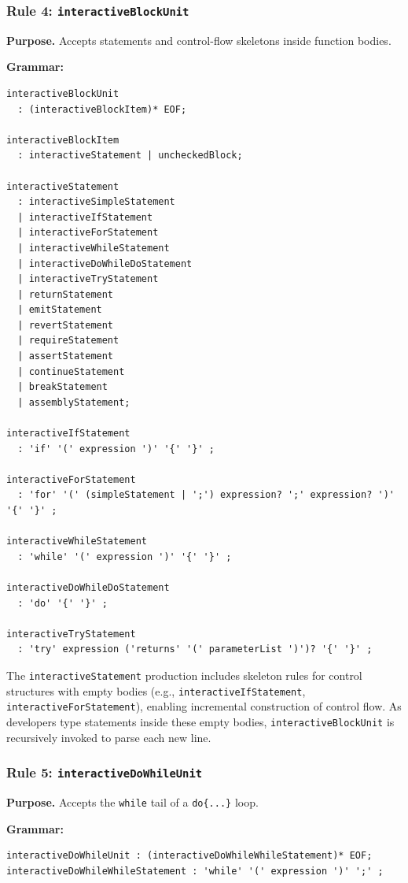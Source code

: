\documentclass[pdflatex,sn-basic]{sn-jnl}%
\theoremstyle{thmstyleone}%
\theoremstyle{thmstyletwo}%
\theoremstyle{thmstylethree}%
\begin{document}
\subsubsection{Rule 4: \texttt{interactiveBlockUnit}}
\noindent\textbf{Purpose.} Accepts statements and control-flow skeletons inside function bodies.

\noindent\textbf{Grammar:}
\begin{verbatim}
interactiveBlockUnit
  : (interactiveBlockItem)* EOF;

interactiveBlockItem
  : interactiveStatement | uncheckedBlock;

interactiveStatement
  : interactiveSimpleStatement
  | interactiveIfStatement
  | interactiveForStatement
  | interactiveWhileStatement
  | interactiveDoWhileDoStatement
  | interactiveTryStatement
  | returnStatement
  | emitStatement
  | revertStatement
  | requireStatement
  | assertStatement
  | continueStatement
  | breakStatement
  | assemblyStatement;

interactiveIfStatement
  : 'if' '(' expression ')' '{' '}' ;

interactiveForStatement
  : 'for' '(' (simpleStatement | ';') expression? ';' expression? ')' '{' '}' ;

interactiveWhileStatement
  : 'while' '(' expression ')' '{' '}' ;

interactiveDoWhileDoStatement
  : 'do' '{' '}' ;

interactiveTryStatement
  : 'try' expression ('returns' '(' parameterList ')')? '{' '}' ;
\end{verbatim}

\noindent The \texttt{interactiveStatement} production includes skeleton rules for
control structures with empty bodies (e.g., \texttt{interactiveIfStatement}, \texttt{interactiveForStatement}),
enabling incremental construction of control flow. As developers type statements inside these
empty bodies, \texttt{interactiveBlockUnit} is recursively invoked to parse each new line.

\subsubsection{Rule 5: \texttt{interactiveDoWhileUnit}}
\noindent\textbf{Purpose.} Accepts the \texttt{while} tail of a \texttt{do\{...\}} loop.

\noindent\textbf{Grammar:}
\begin{verbatim}
interactiveDoWhileUnit : (interactiveDoWhileWhileStatement)* EOF;
interactiveDoWhileWhileStatement : 'while' '(' expression ')' ';' ;
\end{verbatim}
\end{document}
